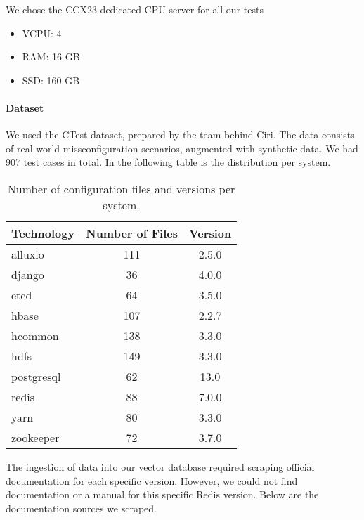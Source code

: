We chose the CCX23 dedicated CPU server\cite{hetzner-online-gmbh-2025} for all our tests
\begin{itemize}
    \item VCPU: 4
    \item RAM: 16 GB
    \item SSD: 160 GB
\end{itemize}

\paragraph{Dataset} 
We used the CTest dataset, prepared by the team behind Ciri\cite{Lian.2024}\cite{xlab-uiuc-2025}. The data consists of real world missconfiguration scenarios, augmented with synthetic data. We had 907 test cases in total. In the following table is the distribution per system.

\begin{table}[h]
    \centering
    \begin{tabular}{|l|c|c|}
        \hline
        \textbf{Technology} & \textbf{Number of Files} & \textbf{Version} \\
        \hline
        alluxio & 111 & 2.5.0 \\
        django & 36 & 4.0.0 \\
        etcd & 64 & 3.5.0 \\
        hbase & 107 & 2.2.7 \\
        hcommon & 138 & 3.3.0 \\
        hdfs & 149 & 3.3.0 \\
        postgresql & 62 & 13.0 \\
        redis & 88 & 7.0.0 \\
        yarn & 80 & 3.3.0 \\
        zookeeper & 72 & 3.7.0 \\
        \hline
    \end{tabular}
    \caption{Number of configuration files and versions per system.}
    \label{tab:technology_values}
\end{table}

The ingestion of data into our vector database required scraping official documentation for each specific version. However, we could not find documentation or a manual for this specific Redis version. Below are the documentation sources we scraped.


